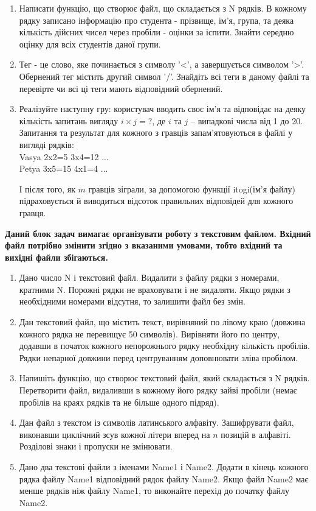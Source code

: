 \documentclass[a5paper,titlepage,openany,twoside,
]
{book_unv}%
\begin{document}
\begin{enumerate}
\begin{enumerate}
\item
  Написати функцію, що створює файл, що складається з N рядків. В кожному рядку
записано інформацію про студента - прізвище, ім'я, група, та деяка 
кількість дійсних чисел через пробіли - оцінки за іспити.
Знайти середню оцінку для всіх студентів даної групи.

\item
Тег - це слово, яке починається з символу '\textless{}', а завершується
символом '\textgreater{}'. Обернений тег містить другий символ '/'.
 Знайдіть всі теги в даному файлі та перевірте чи всі
ці теги мають відповідний обернений.

\item
Реалізуйте наступну гру: користувач вводить своє ім'я та відповідає на 
деяку кількість запитань вигляду $i \times j=?$, де $i$ та $j$ -- випадкові числа від 1 до 20.
Запитання та результат для кожного з гравців запам'ятовуються в файлі у вигляді рядків:\\
Vasya 2x2=5 3x4=12 ... \\
Petya 3x5=15 4x1=4 ...

І після того, як $m$ гравців зіграли, за допомогою функції itogi(ім'я файлу) підраховується й виводиться
 відсоток правильних відповідей для кожного гравця.

\end{enumerate}
\textbf{Даний блок задач вимагає організувати роботу з текстовим файлом. 
Вхідний файл потрібно змінити згідно з вказаними умовами, тобто вхідний та вихідні файли
збігаються.}

\begin{enumerate}
\def\labelenumi{\arabic{enumi})}
\setcounter{enumi}{9}
\item
  Дано число N і текстовий файл. Видалити з файлу рядки з номерами,
  кратними N. Порожні рядки не враховувати і не видаляти. Якщо рядки з
  необхідними номерами відсутня, то залишити файл без змін. 
\item
  Дан текстовий файл, що містить текст, вирівняний по лівому краю
  (довжина кожного рядка не перевищує 50 символів). Вирівняти його по
  центру, додавши в початок кожного непорожнього рядку необхідну кількість
  пробілів. Рядки непарної довжини перед центруванням доповнювати зліва
  пробілом. 
\item
  Напишіть функцію, що створює текстовий файл, який складається з N рядків. Перетворити
  файл, видаливши в кожному його рядку зайві пробіли (немає пробілів на 
краях рядків та не більше одного підряд). 
\item
  Дан файл з текстом із символів латинського алфавіту. Зашифрувати файл,
  виконавши циклічний зсув кожної літери вперед на $n$ позицій в алфавіті.
  Розділові знаки і пропуски не змінювати.
\item
  Дано два текстові файли з іменами Name1 і Name2. Додати в кінець
  кожного рядка файлу Name1 відповідний рядок файлу Name2. Якщо файл
  Name2 має менше рядків ніж файлу Name1, то виконайте перехід до початку файлу
  Name2.


\end{enumerate}
\end{enumerate}
\end{document}
